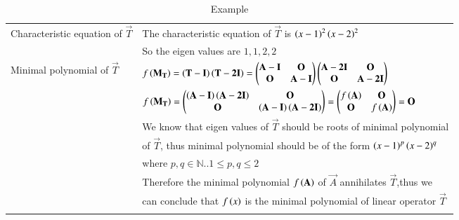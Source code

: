 \begin{longtable}{|l|l|}
         \hline
        Characteristic equation of $\vec{T}$&The characteristic equation of $\vec{T}$ is $\left(x-1\right)^2\left(x-2\right)^2$\\
        & So the eigen values are $1,1,2,2$\\
        \hline
        Minimal polynomial of $\vec{T}$&$f\left(\mathbf{M_T}\right)=\left(\mathbf{T-I}\right)\left(\mathbf{T-2I}\right)=\begin{pmatrix}\mathbf{A-I}&\mathbf{O}\\\mathbf{O}&\mathbf{A-I}\end{pmatrix}\begin{pmatrix}\mathbf{A-2I}&\mathbf{O}\\\mathbf{O}&\mathbf{A-2I}\end{pmatrix}$\\
         &$f\left(\mathbf{M_T}\right)=\begin{pmatrix}\mathbf{\left(A-I\right)\left(A-2I\right)}&\mathbf{O}\\\mathbf{O}&\mathbf{\left(A-I\right)\left(A-2I\right)}\end{pmatrix}=\begin{pmatrix}f\left(\mathbf{A}\right)&\mathbf{O}\\\mathbf{O}&f\left(\mathbf{A}\right)\end{pmatrix}=\mathbf{O}$\\
        & We know that eigen values of $\vec{T}$ should be roots of minimal polynomial\\
        & of $\vec{T}$, thus minimal polynomial should be of the form $\left(x-1\right)^p\left(x-2\right)^q$\\
        & where $p,q \in \mathbb{N}.. 1\leq p,q\leq2$\\
        &Therefore the minimal polynomial $f\left(\mathbf{A}\right)$ of $\vec{A}$ annihilates $\vec{T}$,thus we \\
        & can conclude that $f\left({x}\right)$ is the minimal polynomial of linear operator $\vec{T}$\\
    \hline
    \caption{Example}
    \label{eq:solutions/6/3/10/tab:example}
\end{longtable}
\twocolumn
